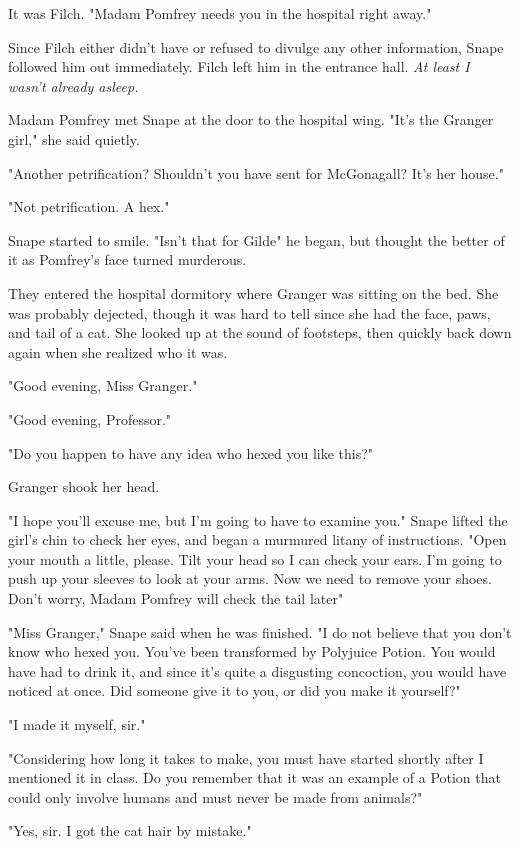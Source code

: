 It was Filch. "Madam Pomfrey needs you in the hospital right away."

Since Filch either didn't have or refused to divulge any other information, Snape followed him out immediately. Filch left him in the entrance hall. \emph{At least I wasn't already asleep.}

Madam Pomfrey met Snape at the door to the hospital wing. "It's the Granger girl," she said quietly.

"Another petrification? Shouldn't you have sent for McGonagall? It's her house."

"Not petrification. A hex."

Snape started to smile. "Isn't that for Gilde{\el}" he began, but thought the better of it as Pomfrey's face turned murderous.

They entered the hospital dormitory where Granger was sitting on the bed. She was probably dejected, though it was hard to tell since she had the face, paws, and tail of a cat. She looked up at the sound of footsteps, then quickly back down again when she realized who it was.

"Good evening, Miss Granger."

"Good evening, Professor."

"Do you happen to have any idea who hexed you like this?"

Granger shook her head.

"I hope you'll excuse me, but I'm going to have to examine you." Snape lifted the girl's chin to check her eyes, and began a murmured litany of instructions. "Open your mouth a little, please. Tilt your head so I can check your ears. I'm going to push up your sleeves to look at your arms. Now we need to remove your shoes. Don't worry, Madam Pomfrey will check the tail later{\el}"

"Miss Granger," Snape said when he was finished. "I do not believe that you don't know who hexed you. You've been transformed by Polyjuice Potion. You would have had to drink it, and since it's quite a disgusting concoction, you would have noticed at once. Did someone give it to you, or did you make it yourself?"

"I made it myself, sir."

"Considering how long it takes to make, you must have started shortly after I mentioned it in class. Do you remember that it was an example of a Potion that could only involve humans and must never be made from animals?"

"Yes, sir. I got the cat hair by mistake."


